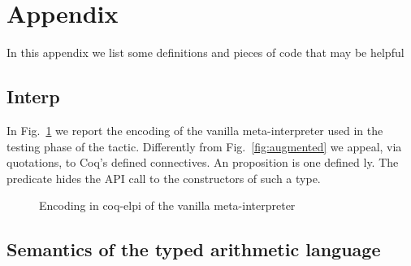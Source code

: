 
\section{Appendix}
\label{sec:app}

In this appendix we list some definitions and pieces of code that may be helpful

\subsection{Interp}


In Fig.~\ref{fig:interp} we report the encoding of the vanilla meta-interpreter used in
the testing phase of the  tactic. Differently from Fig.~\ref{fig:augmented} we appeal, via quotations, to Coq's defined connectives. An  proposition is one defined ly. The predicate  hides the API call to the constructors of such a type.

\begin{figure}
 

\caption{Encoding in coq-elpi of the vanilla meta-interpreter}
\label{fig:interp}
%
%
\end{figure}

\subsection{Semantics of the typed arithmetic language}
\label{ssec:types}

